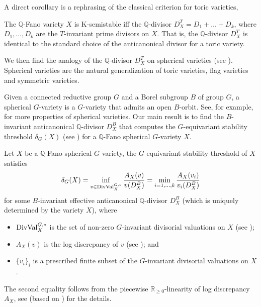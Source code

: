A direct corollary is a rephrasing of the classical criterion for toric varieties,
\begin{corollary}
	The $\mathbb{Q}$-Fano variety $X$ is K-semistable iff the $\mathbb{Q}$-divisor $D^T_X = D_1 + \dots + D_k$, where $D_1, \dots, D_k$ are the $T$-invariant prime divisors on $X$. That is, the $\mathbb{Q}$-divisor $D^T_X$ is identical to the standard choice of the anticanonical divisor for a toric variety.
\end{corollary}

We then find the analogy of the $\mathbb{Q}$-divisor $D^T_X$ on spherical varieties (see ). Spherical varieties are the natural generalization of toric varieties, flag varieties and symmetric varieties.

Given a connected reductive group $G$ and a Borel subgroup $B$ of group $G$, a spherical $G$-variety is a $G$-variety that admits an open $B$-orbit. See, for example, \cite{Timashev_Homo_space_equivar_embed} for more properties of spherical varieties. Our main result is to find the $B$-invariant anticanonical $\mathbb{Q}$-divisor $D^B_X$ that computes the $G$-equivariant stability threshold $\delta_G(X)$ (see ) for a $\mathbb{Q}$-Fano spherical $G$-variety $X$.

\begin{theorem}
	Let $X$ be a $\mathbb{Q}$-Fano spherical $G$-variety, the $G$-equivariant stability threshold of $X$ satisfies
	\begin{equation*}
		\delta_G(X) = \inf_{v \in \GDValo_X} {A_X(v) \over v(D^B_X)} = \min_{i = 1, \dots, k} {A_X(v_i) \over v_i(D^B_X)}
	\end{equation*}
	for some $B$-invariant effective anticanonical $\mathbb{Q}$-divisor $D^B_X$ (which is uniquely determined by the variety $X$), where 
	\begin{itemize}
		\item $\mathrm{DivVal}^{G, \circ}_X$ is the set of non-zero $G$-invariant divisorial valuations on $X$ (see );
		\item $A_X(v)$ is the log discrepancy of $v$ (see ); and
		\item $\{v_i\}_i$ is a prescribed finite subset of the $G$-invariant divisorial valuations on $X$.
	\end{itemize}
\end{theorem}
\begin{remark*}
	The second equality follows from the piecewise $\mathbb{R}_{\geq 0}$-linearity of log discrepancy $A_X$, see \cite{Golota_Delta_Fano_large_aut} (based on \cite[Proposition 5.2]{Pas_sing_sphe}) for the details.
\end{remark*}

